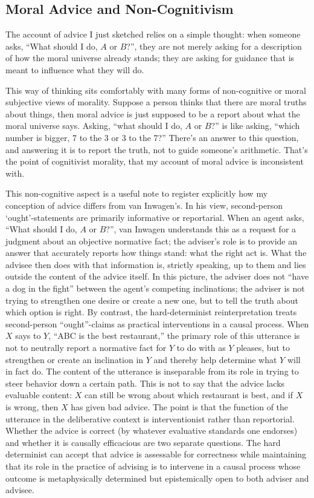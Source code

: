 \subsection{Moral Advice and Non-Cognitivism}

The account of advice I just sketched relies on a simple thought: when
someone asks, ``What should I do, $A$ or $B$?'', they are not merely asking
for a description of how the moral universe already stands; they are
asking for guidance that is meant to influence what they will do.

This way of thinking sits comfortably with many forms of non-cognitive
or moral subjective views of morality. Suppose a person thinks that
there are moral truths about things, then moral advice is just supposed
to be a report about what the moral universe says. Asking, ``what should
I do, $A$ or $B$?'' is like asking, ``which number is bigger, 7 to the 3 or
3 to the 7?'' There's an answer to this question, and answering it is to
report the truth, not to guide someone's arithmetic. That's the point of
cognitivist morality, that my account of moral advice is inconsistent
with.

This non-cognitive aspect is a useful note to register explicitly how my
conception of advice differs from van Inwagen's. In his view,
second-person `ought'-statements are primarily informative or
reportarial. When an agent asks, ``What should I do, $A$ or $B$?'', van
Inwagen understands this as a request for a judgment about an objective
normative fact; the adviser's role is to provide an answer that
accurately reports how things stand: what the right act is. What the
advisee then does with that information is, strictly speaking, up to
them and lies outside the content of the advice itself. In this picture,
the adviser does not ``have a dog in the fight'' between the agent's
competing inclinations; the adviser is not trying to strengthen one
desire or create a new one, but to tell the truth about which option is
right. By contrast, the hard-determinist reinterpretation treats
second-person ``ought''-claims as practical interventions in a causal
process. When $X$ says to $Y$, ``ABC is the best restaurant,'' the primary
role of this utterance is not to neutrally report a normative fact for $Y$
to do with as $Y$ pleases, but to strengthen or create an inclination in $Y$
and thereby help determine what $Y$ will in fact do. The content of the
utterance is inseparable from its role in trying to steer behavior down
a certain path. This is not to say that the advice lacks evaluable
content: $X$ can still be wrong about which restaurant is best, and if $X$
is wrong, then $X$ has given bad advice. The point is that the function of
the utterance in the deliberative context is interventionist rather than
reportorial. Whether the advice is correct (by whatever evaluative
standards one endorses) and whether it is causally efficacious are two
separate questions. The hard determinist can accept that advice is
assessable for correctness while maintaining that its role in the
practice of advising is to intervene in a causal process whose outcome
is metaphysically determined but epistemically open to both adviser and
advisee.

